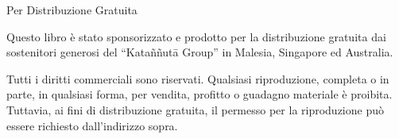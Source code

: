 
\vspace*{4\baselineskip}

{\centering

\begin{minipage}{0.9\linewidth}
\centering\small
Per Distribuzione Gratuita
\bigskip

Questo libro è stato sponsorizzato e prodotto per la distribuzione gratuita dai
sostenitori generosi del ``Kataññutā Group'' in Malesia, Singapore ed Australia.

\bigskip

Tutti i diritti commerciali sono riservati. Qualsiasi riproduzione,
completa o in parte, in qualsiasi forma, per vendita, profitto o
guadagno materiale è proibita. Tuttavia, ai fini di distribuzione
gratuita, il permesso per la riproduzione può essere richiesto
dall'indirizzo sopra.

\end{minipage}

}
